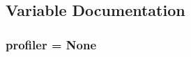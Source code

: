 \subsection{Variable Documentation}
\hypertarget{namespacepyneb_1_1core_1_1pynebcore_a5adecc87efd257b54198f2064493502a}{
\subsubsection[{profiler}]{\setlength{\rightskip}{0pt plus 5cm}profiler = None}}\label{namespacepyneb_1_1core_1_1pynebcore_a5adecc87efd257b54198f2064493502a}
